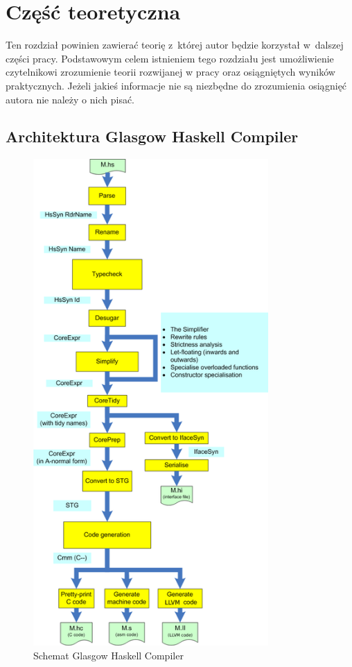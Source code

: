 \chapter{Część teoretyczna}\label{chap:teoria}
Ten rozdział powinien zawierać teorię z~której autor będzie korzystał w~dalszej
części pracy.  Podstawowym celem istnieniem tego rozdziału jest umożliwienie
czytelnikowi zrozumienie teorii rozwijanej w pracy oraz osiągniętych wyników
praktycznych.  Jeżeli jakieś informacje nie są niezbędne do zrozumienia
osiągnięć autora nie należy o nich pisać.

\section{Architektura Glasgow Haskell Compiler}

\begin{figure}[ht]
    \centering
    \includegraphics[width=0.8\textwidth]{images/AOSA_compiler}
    \caption{Schemat Glasgow Haskell Compiler\cite{AOSA}}
    \label{fig:AOSA_compiler}
\end{figure}


